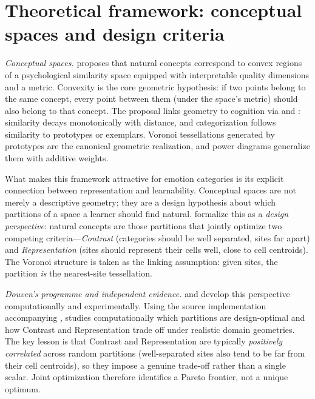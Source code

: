 \documentclass[11pt]{article}
\begin{document}
\section{Theoretical framework: conceptual spaces and design criteria}
\label{sec:framework}

\emph{Conceptual spaces.} \citet{gardenfors2000conceptual} proposes that natural concepts correspond to convex regions of a psychological similarity space equipped with interpretable quality dimensions and a metric. Convexity is the core geometric hypothesis: if two points belong to the same concept, every point between them (under the space's metric) should also belong to that concept. The proposal links geometry to cognition via \citet{shepard1987toward} and \citet{nosofsky1986attention}: similarity decays monotonically with distance, and categorization follows similarity to prototypes or exemplars. Voronoi tessellations generated by prototypes are the canonical geometric realization, and power diagrams \citep{aurenhammer1987power} generalize them with additive weights.

What makes this framework attractive for emotion categories is its explicit connection between representation and learnability. Conceptual spaces are not merely a descriptive geometry; they are a design hypothesis about which partitions of a space a learner should find natural. \citet{douven-gardenfors-2020} formalize this as a \emph{design perspective}: natural concepts are those partitions that jointly optimize two competing criteria---\emph{Contrast} (categories should be well separated, sites far apart) and \emph{Representation} (sites should represent their cells well, close to cell centroids). The Voronoi structure is taken as the linking assumption: given sites, the partition \emph{is} the nearest-site tessellation.

\emph{Douven's programme and independent evidence.} \citet{douven-2023-naturalness} and \citet{douven-verheyen-2026} develop this perspective computationally and experimentally. Using the source implementation accompanying \citet{douven-code-2023}, \citet{douven-2023-naturalness} studies computationally which partitions are design-optimal and how Contrast and Representation trade off under realistic domain geometries. The key lesson is that Contrast and Representation are typically \emph{positively correlated} across random partitions (well-separated sites also tend to be far from their cell centroids), so they impose a genuine trade-off rather than a single scalar. Joint optimization therefore identifies a Pareto frontier, not a unique optimum.
\end{document}
